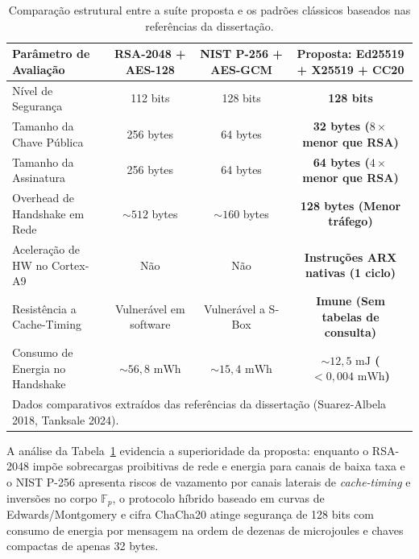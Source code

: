 \begin{table}[htbp]
\centering
\caption{Comparação estrutural entre a suíte proposta e os padrões clássicos baseados nas referências da dissertação.}
\label{tab:comparativo_estrutural_literatura}
\begin{tabular}{lccc}
\hline
\textbf{Parâmetro de Avaliação} & \textbf{RSA-2048 + AES-128} & \textbf{NIST P-256 + AES-GCM} & \textbf{Proposta: Ed25519 + X25519 + CC20} \\
\hline
Nível de Segurança & 112 bits & 128 bits & \textbf{128 bits} \\
Tamanho da Chave Pública & 256 bytes & 64 bytes & \textbf{32 bytes ($8\times$ menor que RSA)} \\
Tamanho da Assinatura & 256 bytes & 64 bytes & \textbf{64 bytes ($4\times$ menor que RSA)} \\
Overhead de Handshake em Rede & $\sim 512$ bytes & $\sim 160$ bytes & \textbf{128 bytes (Menor tráfego)} \\
Aceleração de HW no Cortex-A9 & Não & Não & \textbf{Instruções ARX nativas (1 ciclo)} \\
Resistência a Cache-Timing & Vulnerável em software & Vulnerável a S-Box & \textbf{Imune (Sem tabelas de consulta)} \\
Consumo de Energia no Handshake & $\sim 56{,}8\text{ mWh}$ & $\sim 15{,}4\text{ mWh}$ & \textbf{$\sim 12{,}5\text{ mJ}$ ($< 0{,}004\text{ mWh}$)} \\
\hline
\multicolumn{4}{l}{\footnotesize Dados comparativos extraídos das referências da dissertação (Suarez-Albela 2018, Tanksale 2024).} \\
\end{tabular}
\end{table}

A análise da Tabela~\ref{tab:comparativo_estrutural_literatura} evidencia a superioridade da proposta: enquanto o RSA-2048 impõe sobrecargas proibitivas de rede e energia para canais de baixa taxa e o NIST P-256 apresenta riscos de vazamento por canais laterais de \textit{cache-timing} e inversões no corpo $\mathbb{F}_p$, o protocolo híbrido baseado em curvas de Edwards/Montgomery e cifra ChaCha20 atinge segurança de 128 bits com consumo de energia por mensagem na ordem de dezenas de microjoules e chaves compactas de apenas 32 bytes.

